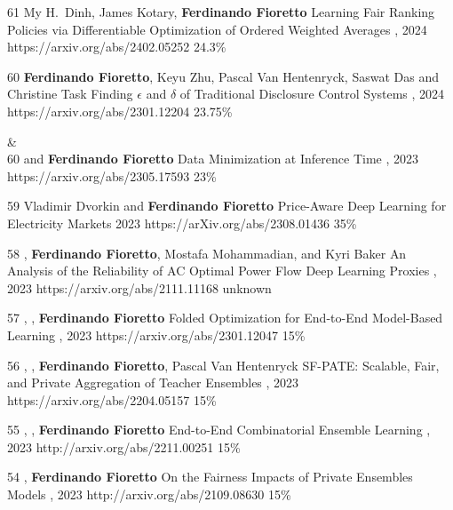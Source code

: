 \begin{pubs}
\confentry
	{61}
	{\student{} My H.~Dinh, \student{} James Kotary, {\bf Ferdinando Fioretto}}
	{Learning Fair Ranking Policies via Differentiable Optimization of Ordered Weighted Averages}
	{\procFAccT, 2024}
	{https://arxiv.org/abs/2402.05252}
	{24.3\%}

\confentry
	{60}
	{{\bf Ferdinando Fioretto}, Keyu Zhu, Pascal Van Hentenryck, \student{} Saswat Das and Christine Task}
  	{Finding $\epsilon$ and $\delta$ of Traditional Disclosure Control Systems}
	{\procAAAI, 2024}
	{https://arxiv.org/abs/2301.12204}
	{23.75\%}

{}&\nemph{\rule{0.5\linewidth}{0.5pt}}\\[1em]

\confentry
	{60}
	{ and {\bf Ferdinando Fioretto}}
	{Data Minimization at Inference Time}
	{\procNeurIPS, 2023}
	{https://arxiv.org/abs/2305.17593}
	{23\%}

\confentry
	{59}
 	{Vladimir Dvorkin and {\bf Ferdinando Fioretto}}
  	{Price-Aware Deep Learning for Electricity Markets}
  	{ 2023}
  	{https://arXiv.org/abs/2308.01436}
  	{35\%}

\confentry
	{58}
	{, {\bf Ferdinando Fioretto}, Mostafa Mohammadian, and Kyri Baker}
	{An Analysis of the Reliability of AC Optimal Power Flow Deep Learning Proxies}
	{, 2023}
	{https://arxiv.org/abs/2111.11168}
	{unknown}

\confentry 
	{57} %
	{, , {\bf Ferdinando Fioretto}}
	{Folded Optimization for End-to-End Model-Based Learning}
	{\procIJCAI, 2023}
	{https://arxiv.org/abs/2301.12047}
	{15\%}

\confentry
    {56} %
	{, , {\bf Ferdinando Fioretto}, Pascal Van Hentenryck}
	{SF-PATE: Scalable, Fair, and Private Aggregation of Teacher Ensembles}
    {\procIJCAI, 2023}
	{https://arxiv.org/abs/2204.05157}
    {15\%}

\confentry
    {55} %
	{, , {\bf Ferdinando Fioretto}}
	{End-to-End Combinatorial Ensemble Learning}
    {\procIJCAI, 2023}
	{http://arxiv.org/abs/2211.00251}
    {15\%}

\confentry
    {54} %
	{, {\bf Ferdinando Fioretto}}
	{On the Fairness Impacts of Private Ensembles Models}
    {\procIJCAI, 2023}
	{http://arxiv.org/abs/2109.08630}
    {15\%}


\end{pubs}
